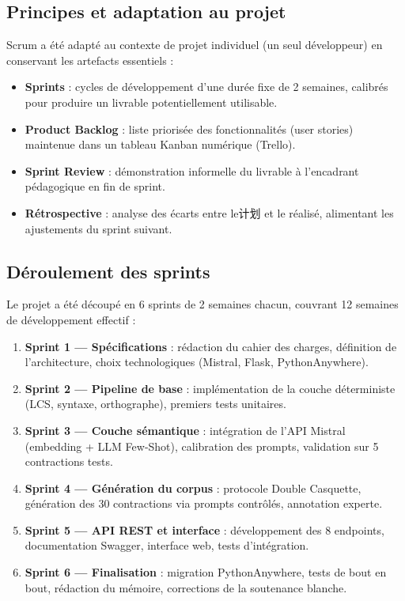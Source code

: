 \subsection{Principes et adaptation au projet}

Scrum a été adapté au contexte de projet individuel (un seul développeur) en conservant les artefacts essentiels :

\begin{itemize}
    \item \textbf{Sprints} : cycles de développement d'une durée fixe de 2 semaines, calibrés pour produire un livrable potentiellement utilisable.
    \item \textbf{Product Backlog} : liste priorisée des fonctionnalités (user stories) maintenue dans un tableau Kanban numérique (Trello).
    \item \textbf{Sprint Review} : démonstration informelle du livrable à l'encadrant pédagogique en fin de sprint.
    \item \textbf{Rétrospective} : analyse des écarts entre le计划 et le réalisé, alimentant les ajustements du sprint suivant.
\end{itemize}

\subsection{Déroulement des sprints}

Le projet a été découpé en 6 sprints de 2 semaines chacun, couvrant 12 semaines de développement effectif :

\begin{enumerate}
    \item \textbf{Sprint 1 — Spécifications} : rédaction du cahier des charges, définition de l'architecture, choix technologiques (Mistral, Flask, PythonAnywhere).
    \item \textbf{Sprint 2 — Pipeline de base} : implémentation de la couche déterministe (LCS, syntaxe, orthographe), premiers tests unitaires.
    \item \textbf{Sprint 3 — Couche sémantique} : intégration de l'API Mistral (embedding + LLM Few-Shot), calibration des prompts, validation sur 5 contractions tests.
    \item \textbf{Sprint 4 — Génération du corpus} : protocole Double Casquette, génération des 30 contractions via prompts contrôlés, annotation experte.
    \item \textbf{Sprint 5 — API REST et interface} : développement des 8 endpoints, documentation Swagger, interface web, tests d'intégration.
    \item \textbf{Sprint 6 — Finalisation} : migration PythonAnywhere, tests de bout en bout, rédaction du mémoire, corrections de la soutenance blanche.
\end{enumerate}

